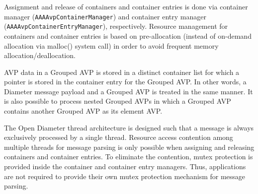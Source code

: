 \documentclass{article}
\begin{document}
Assignment and release of containers and container entries is done via
container manager ({\tt AAAAvpContainerManager}) and container entry
manager\\ ({\tt AAAAvpContainerEntryManager}), respectively.  Resource
management for containers and container entries is based on
pre-allocation (instead of on-demand allocation via malloc() system
call) in order to avoid frequent memory allocation/deallocation.

AVP data in a Grouped AVP is stored in a distinct container list for
which a pointer is stored in the container entry for the Grouped AVP.
In other words, a Diameter message payload and a Grouped AVP is treated
in the same manner.  It is also possible to process nested Grouped AVPs
in which a Grouped AVP contains another Grouped AVP as its element AVP.

The Open Diameter thread architecture is designed such that a message is
always exclusively processed by a single thread.  Resource access
contention among multiple threads for message parsing is only possible
when assigning and releasing containers and container entries.  To
eliminate the contention, mutex protection is provided inside the
container and container entry managers.  Thus, applications are not
required to provide their own mutex protection mechanism for message
parsing.

\begin{figure}[htbp]
\end{figure}
\end{document}
